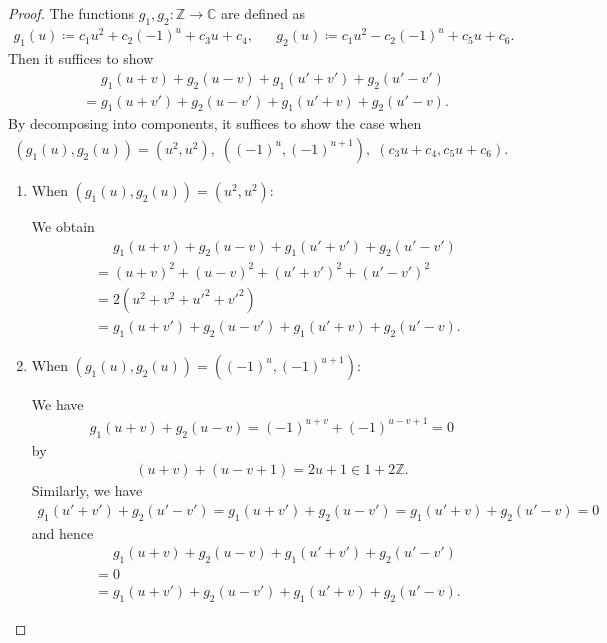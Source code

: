 \documentclass[12pt]{article}
\theoremstyle{definition}
\theoremstyle{remark}
\numberwithin{equation}{section}
\numberwithin{figure}{section}
\numberwithin{table}{section}
\begin{document}
\begin{proof}
The functions $ g_1 , g_2 \colon \mathbb{ Z } \to \mathbb{ C } $ are defined as
\begin{align}
    g_1 ( u ) \coloneqq c_1 u^2 + c_2 ( - 1 )^u + c_3 u + c_4, & &
    g_2 ( u ) \coloneqq c_1 u^2 - c_2 ( - 1 )^u + c_5 u + c_6.
\end{align}
Then it suffices to show
\begin{align}
& \phantom{ { } = { } } g_1 ( u + v ) + g_2 ( u - v ) + g_1 ( u' + v' ) + g_2 ( u' - v' ) \\
& = g_1 ( u + v' ) + g_2 ( u - v' ) + g_1 ( u' + v ) + g_2 ( u' - v ).
\label{eq:Gauss-Kac-Bernstein-observe-proof-g}
\end{align}
By decomposing into components, it suffices to show the case when
\begin{align}
    ( g_1 ( u ) , g_2 ( u ) ) = ( u^2 , u^2 ) , \; ( ( - 1 )^{ u } , ( - 1 )^{ u + 1 } ) , \; ( c_3 u + c_4 , c_5 u + c_6 ).
\end{align}

\begin{enumerate}[label=(Case \arabic*)]
    \item
    
    When $ ( g_1 ( u ) , g_2 ( u ) ) = ( u^2 , u^2 ) $:

    We obtain
\begin{align}
& \phantom{ { } = { } } g_1 ( u + v ) + g_2 ( u - v ) + g_1 ( u' + v' ) + g_2 ( u' - v' ) \\
& = ( u + v )^2 + ( u - v )^2 + ( u' + v' )^2 + ( u' - v' )^2 \\
& = 2 ( u^2 + v^2 + {u'}^2 + {v'}^2 ) \\
& = g_1 ( u + v' ) + g_2 ( u - v' ) + g_1 ( u' + v ) + g_2 ( u' - v ).
\end{align}

\item

When $ ( g_1 ( u ) , g_2 ( u ) ) = ( ( - 1 )^{ u } , ( - 1 )^{ u + 1 } ) $:

We have
\begin{align}
    g_1 ( u + v ) + g_2 ( u - v )
    = ( - 1 )^{ u + v } + ( - 1 )^{ u - v + 1 }
    = 0
\end{align}
by
\begin{align}
    ( u + v ) + ( u - v + 1 ) = 2 u + 1 \in 1 + 2 \mathbb{ Z }.
\end{align}
Similarly, we have
\begin{align}
    g_1 ( u' + v' ) + g_2 ( u' - v' )
    = g_1 ( u + v' ) + g_2 ( u - v' )
    = g_1 ( u' + v ) + g_2 ( u' - v )
    = 0
\end{align}
and hence
\begin{align}
    & \phantom{ { } = { } } g_1 ( u + v ) + g_2 ( u - v ) + g_1 ( u' + v' ) + g_2 ( u' - v' ) \\
    & = 0 \\
    & = g_1 ( u + v' ) + g_2 ( u - v' ) + g_1 ( u' + v ) + g_2 ( u' - v ).
\end{align}


\end{enumerate}
\end{proof}
\end{document}
